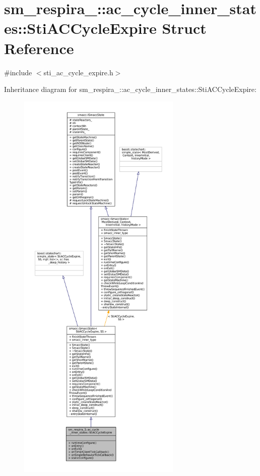 \hypertarget{structsm__respira__1_1_1ac__cycle__inner__states_1_1StiACCycleExpire}{}\section{sm\+\_\+respira\+\_\+:\+:ac\+\_\+cycle\+\_\+inner\+\_\+states\+:\+:Sti\+A\+C\+Cycle\+Expire Struct Reference}
\label{structsm__respira__1_1_1ac__cycle__inner__states_1_1StiACCycleExpire}


{\ttfamily \#include $<$sti\+\_\+ac\+\_\+cycle\+\_\+expire.\+h$>$}



Inheritance diagram for sm\+\_\+respira\+\_\+:\+:ac\+\_\+cycle\+\_\+inner\+\_\+states\+:\+:Sti\+A\+C\+Cycle\+Expire\+:
\nopagebreak
\begin{figure}[H]
\begin{center}
\leavevmode
\includegraphics[height=550pt]{structsm__respira__1_1_1ac__cycle__inner__states_1_1StiACCycleExpire__inherit__graph}
\end{center}
\end{figure}


